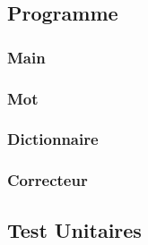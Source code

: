 \UseRawInputEncoding

\subsection{Programme}
        \subsubsection{Main}
                

                \clearpage
        \subsubsection{Mot}
                
                
                \clearpage
        \subsubsection{Dictionnaire}
                
                
                \clearpage
        \subsubsection{Correcteur}
                
                
                \clearpage
        \subsection{Test Unitaires}
            
